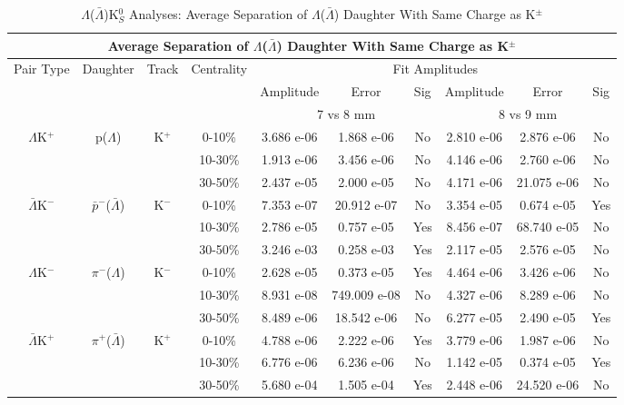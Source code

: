 \documentclass[../AnalysisNoteJBuxton.tex]{subfiles}
\begin{document}
\begin{table}
 \centering
 \begin{tabular}{|c|c|c|c|c|c|c||c|c|c|}
  \multicolumn{10}{c}{Average Separation of $\Lambda$($\bar{\Lambda}$) Daughter With Same Charge as K$^{\pm}$} \\
  \hline
  \multirow{3}{*}{Pair Type} & \multirow{3}{*}{Daughter} & \multirow{3}{*}{Track} & \multirow{3}{*}{Centrality} & \multicolumn{6}{c|}{Fit Amplitudes} \\
  \cline{5-10}
   & & & & Amplitude & Error & Sig & Amplitude & Error & Sig \\  
  \cline{5-10}
   & & & & \multicolumn{3}{c||}{7 vs 8 mm} & \multicolumn{3}{c|}{8 vs 9 mm} \\  
  \hline
  \multirow{3}{*}{$\Lambda$K$^{+}$} & \multirow{3}{*}{p($\Lambda$)} & \multirow{3}{*}{K$^{+}$}
   &      0-10\% & 3.686 e-06 & 1.868 e-06 & No & 2.810 e-06 & 2.876 e-06 & No \\
   & & & 10-30\% & 1.913 e-06 & 3.456 e-06 & No & 4.146 e-06 & 2.760 e-06 & No \\
   & & & 30-50\% & 2.437 e-05 & 2.000 e-05 & No & 4.171 e-06 & 21.075 e-06 & No \\
  \hline
  \multirow{3}{*}{$\bar{\Lambda}$K$^{-}$} & \multirow{3}{*}{$\bar{p}^{-}$($\bar{\Lambda}$)} & \multirow{3}{*}{K$^{-}$}
   &      0-10\% & 7.353 e-07 & 20.912 e-07 & No & 3.354 e-05 & 0.674 e-05 & Yes \\
   & & & 10-30\% & 2.786 e-05 & 0.757 e-05 & Yes & 8.456 e-07 & 68.740 e-05 & No \\
   & & & 30-50\% & 3.246 e-03 & 0.258 e-03 & Yes & 2.117 e-05 & 2.576 e-05 & No \\
  \hline \hline
  \multirow{3}{*}{$\Lambda$K$^{-}$} & \multirow{3}{*}{$\pi^{-}$($\Lambda$)} & \multirow{3}{*}{K$^{-}$}
   &      0-10\% & 2.628 e-05 & 0.373 e-05 & Yes & 4.464 e-06 & 3.426 e-06 & No \\
   & & & 10-30\% & 8.931 e-08 & 749.009 e-08 & No & 4.327 e-06 & 8.289 e-06 & No \\
   & & & 30-50\% & 8.489 e-06 & 18.542 e-06 & No & 6.277 e-05 & 2.490 e-05 & Yes \\
  \hline
  \multirow{3}{*}{$\bar{\Lambda}$K$^{+}$} & \multirow{3}{*}{$\pi^{+}$($\bar{\Lambda}$)} & \multirow{3}{*}{K$^{+}$}
   &      0-10\% & 4.788 e-06 & 2.222 e-06 & Yes & 3.779 e-06 & 1.987 e-06 & No \\
   & & & 10-30\% & 6.776 e-06 & 6.236 e-06 & No & 1.142 e-05 & 0.374 e-05 & Yes \\
   & & & 30-50\% & 5.680 e-04 & 1.505 e-04 & Yes & 2.448 e-06 & 24.520 e-06 & No \\
  \hline
 \end{tabular}
 \caption{$\Lambda$($\bar{\Lambda}$)K$^{0}_{S}$ Analyses: Average Separation of $\Lambda$($\bar{\Lambda}$) Daughter With Same Charge as K$^{\pm}$}
 \label{tab:AvgSepLamKch}
\end{table}
\end{document}

